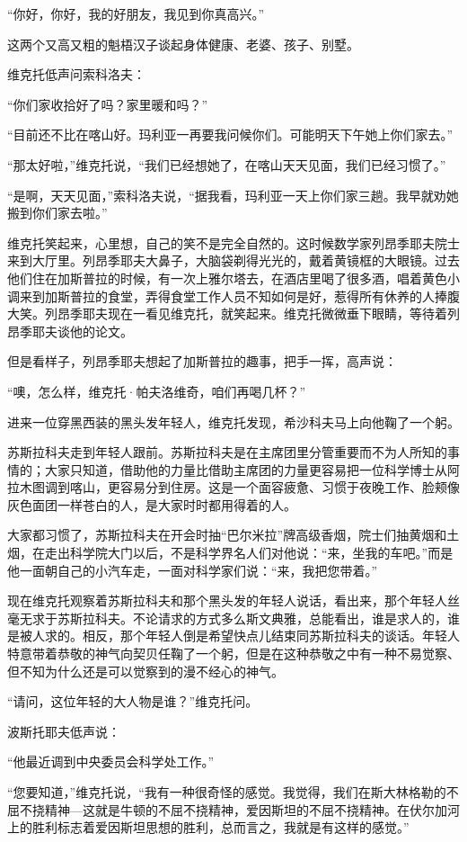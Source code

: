 “你好，你好，我的好朋友，我见到你真高兴。”

这两个又高又粗的魁梧汉子谈起身体健康、老婆、孩子、别墅。

维克托低声问索科洛夫：

“你们家收拾好了吗？家里暖和吗？”

“目前还不比在喀山好。玛利亚一再要我问候你们。可能明天下午她上你们家去。”

“那太好啦，”维克托说，“我们已经想她了，在喀山天天见面，我们已经习惯了。”

“是啊，天天见面，”索科洛夫说，“据我看，玛利亚一天上你们家三趟。我早就劝她搬到你们家去啦。”

维克托笑起来，心里想，自己的笑不是完全自然的。这时候数学家列昂季耶夫院士来到大厅里。列昂季耶夫大鼻子，大脑袋剃得光光的，戴着黄镜框的大眼镜。过去他们住在加斯普拉的时候，有一次上雅尔塔去，在酒店里喝了很多酒，唱着黄色小调来到加斯普拉的食堂，弄得食堂工作人员不知如何是好，惹得所有休养的人捧腹大笑。列昂季耶夫现在一看见维克托，就笑起来。维克托微微垂下眼睛，等待着列昂季耶夫谈他的论文。

但是看样子，列昂季耶夫想起了加斯普拉的趣事，把手一挥，高声说：

“噢，怎么样，维克托·帕夫洛维奇，咱们再喝几杯？”

进来一位穿黑西装的黑头发年轻人，维克托发现，希沙科夫马上向他鞠了一个躬。

苏斯拉科夫走到年轻人跟前。苏斯拉科夫是在主席团里分管重要而不为人所知的事情的；大家只知道，借助他的力量比借助主席团的力量更容易把一位科学博士从阿拉木图调到喀山，更容易分到住房。这是一个面容疲惫、习惯于夜晚工作、脸颊像灰色面团一样苍白的人，是大家时时都用得着的人。

大家都习惯了，苏斯拉科夫在开会时抽“巴尔米拉”牌高级香烟，院士们抽黄烟和土烟，在走出科学院大门以后，不是科学界名人们对他说：“来，坐我的车吧。”而是他一面朝自己的小汽车走，一面对科学家们说：“来，我把您带着。”

现在维克托观察着苏斯拉科夫和那个黑头发的年轻人说话，看出来，那个年轻人丝毫无求于苏斯拉科夫。不论请求的方式多么斯文典雅，总能看出，谁是求人的，谁是被人求的。相反，那个年轻人倒是希望快点儿结束同苏斯拉科夫的谈话。年轻人特意带着恭敬的神气向契贝任鞠了一个躬，但是在这种恭敬之中有一种不易觉察、但不知为什么还是可以觉察到的漫不经心的神气。

“请问，这位年轻的大人物是谁？”维克托问。

波斯托耶夫低声说：

“他最近调到中央委员会科学处工作。”

“您要知道，”维克托说，“我有一种很奇怪的感觉。我觉得，我们在斯大林格勒的不屈不挠精神—这就是牛顿的不屈不挠精神，爱因斯坦的不屈不挠精神。在伏尔加河上的胜利标志着爱因斯坦思想的胜利，总而言之，我就是有这样的感觉。”

